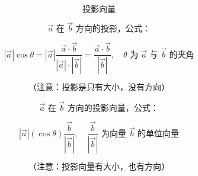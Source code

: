 \[
	\text{投影向量}
\]

\[
	\vec a \text{ 在 } \vec b \text{ 方向的投影，公式：}
\]

\[
	|\vec a|\cos\theta
	=
	|\vec a|\frac{\vec a\cdot \vec b}{|\vec a|\cdot|\vec b|}
	=
	\frac{\vec a\cdot \vec b}{|\vec b|},
	\quad
	\theta \text{ 为 } \vec a \text{ 与 } \vec b \text{ 的夹角}
\]

\[
	\text{（注意：投影是只有大小，没有方向）}
\]

\[
	\vec a \text{ 在 } \vec b \text{ 方向的投影向量，公式：}
\]

\[
	|\vec a|(\cos\theta)\frac{\vec b}{|\vec b|},
	\quad
	\frac{\vec b}{|\vec b|}
	\text{ 为向量 } \vec b \text{ 的单位向量}
\]

\[
	\text{（注意：投影向量有大小，也有方向）}
\]